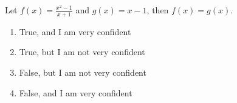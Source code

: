 \bigskip

\item Let $f(x) = \frac{x^2 -1}{x+1}$ and $g(x) = x-1$, then $f(x) = g(x)$.

\begin{enumerate}
\item True, and I am very confident
\item True, but I am not very confident
\item False, but I am not very confident
\item False, and I am very confident
\end{enumerate}

